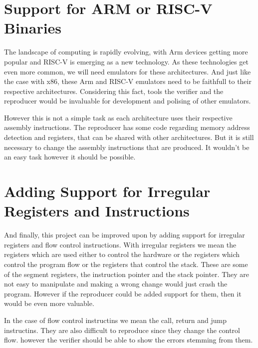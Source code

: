 \section{Support for ARM or RISC-V Binaries}
The landscape of computing is rapidly evolving, with Arm devices getting more popular and RISC-V is emerging as a new technology.
As these technologies get even more common, we will need emulators for these architectures.
And just like the case with x86, these Arm and RISC-V emulators need to be faithfull to their respective architectures.
Considering this fact, tools the verifier and the reproducer would be invaluable for development and polising of other emulators.

However this is not a simple task as each architecture uses their respective assembly instructions.
The reproducer has some code regarding memory address detection and registers, that can be shared with other architectures.
But it is still necessary to change the assembly instructions that are produced.
It wouldn't be an easy task however it should be possible.

\section{Adding Support for Irregular Registers and Instructions}
And finally, this project can be improved upon by adding support for irregular registers and flow control instructions.
With irregular registers we mean the registers which are used either to control the hardware or the registers which control the program flow or the registers that control the stack.
These are some of the segment registers, the instruction pointer and the stack pointer.
They are not easy to manipulate and making a wrong change would just crash the program.
However if the reproducer could be added support for them, then it would be even more valuable.

In the case of flow control instructins we mean the call, return and jump instructins.
They are also difficult to reproduce since they change the control flow.
however the verifier should be able to show the errors stemming from them.

